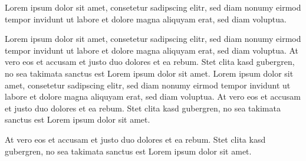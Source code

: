 


{}

Lorem ipsum dolor sit amet, consetetur sadipscing elitr, sed
diam nonumy eirmod tempor invidunt ut labore et dolore magna aliquyam
erat, sed diam voluptua.

\clozeparcmd Lorem ipsum dolor sit amet, consetetur sadipscing elitr, sed
diam nonumy eirmod tempor invidunt ut labore et dolore magna aliquyam
erat, sed diam voluptua. At vero eos et accusam et justo duo dolores et
ea rebum. Stet clita kasd gubergren, no sea takimata sanctus est Lorem
ipsum dolor sit amet. Lorem ipsum dolor sit amet, consetetur sadipscing
elitr, sed diam nonumy eirmod tempor invidunt ut labore et dolore magna
aliquyam erat, sed diam voluptua. At vero eos et accusam et justo duo
dolores et ea rebum. Stet clita kasd gubergren, no sea takimata sanctus
est Lorem ipsum dolor sit amet.

At vero eos et accusam et justo duo
dolores et ea rebum. Stet clita kasd gubergren, no sea takimata sanctus
est Lorem ipsum dolor sit amet.

\bye
